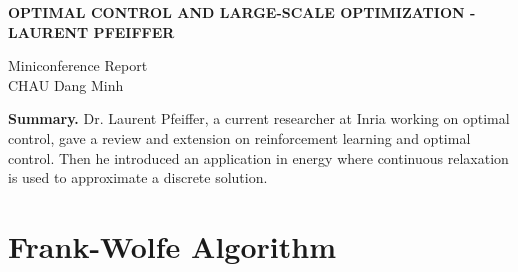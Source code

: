 \begin{center}
    \textbf{\Large OPTIMAL CONTROL AND LARGE-SCALE OPTIMIZATION - LAURENT PFEIFFER} \\
    \vspace{0.5cm}

    Miniconference Report \\
    CHAU Dang Minh
\end{center}

\begin{center}
    \begin{minipage}{0.85\textwidth}
        \textbf{Summary.} Dr. Laurent Pfeiffer, a current researcher at Inria working on optimal control, gave a review and extension on reinforcement learning and optimal control. Then he introduced an application in energy where continuous relaxation is used to approximate a discrete solution.
    \end{minipage}
\end{center}

\vspace{1cm}

\section{Frank-Wolfe Algorithm}

